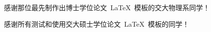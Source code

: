 \begin{thanks}

  感谢那位最先制作出博士学位论文~\LaTeX~模板的交大物理系同学！

  感谢所有测试和使用交大硕士学位论文~\LaTeX~模板的同学！
  
\end{thanks}
